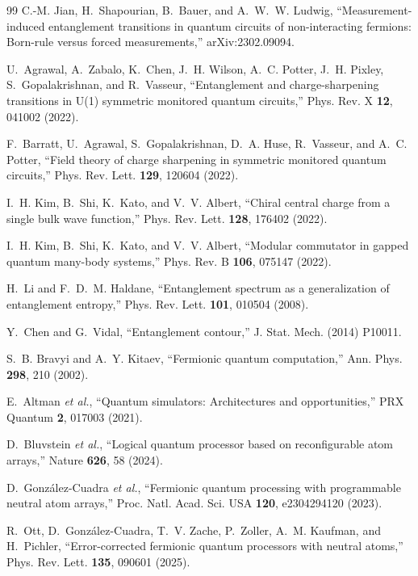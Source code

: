 \documentclass[aps,prl,twocolumn,floatfix,superscriptaddress,nofootinbib]{revtex4-2}
\begin{document}
\begin{thebibliography}{99}
C.-M. Jian, H.~Shapourian, B.~Bauer, and A.~W.~W. Ludwig,
``Measurement-induced entanglement transitions in quantum circuits of non-interacting fermions: Born-rule versus forced measurements,''
arXiv:2302.09094.

U.~Agrawal, A.~Zabalo, K.~Chen, J.~H. Wilson, A.~C. Potter, J.~H. Pixley, S.~Gopalakrishnan, and R.~Vasseur,
``Entanglement and charge-sharpening transitions in U(1) symmetric monitored quantum circuits,''
Phys. Rev. X \textbf{12}, 041002 (2022).

F.~Barratt, U.~Agrawal, S.~Gopalakrishnan, D.~A. Huse, R.~Vasseur, and A.~C. Potter,
``Field theory of charge sharpening in symmetric monitored quantum circuits,''
Phys. Rev. Lett. \textbf{129}, 120604 (2022).

I.~H. Kim, B.~Shi, K.~Kato, and V.~V. Albert,
``Chiral central charge from a single bulk wave function,''
Phys. Rev. Lett. \textbf{128}, 176402 (2022).

I.~H. Kim, B.~Shi, K.~Kato, and V.~V. Albert,
``Modular commutator in gapped quantum many-body systems,''
Phys. Rev. B \textbf{106}, 075147 (2022).

H.~Li and F.~D.~M. Haldane,
``Entanglement spectrum as a generalization of entanglement entropy,''
Phys. Rev. Lett. \textbf{101}, 010504 (2008).

Y.~Chen and G.~Vidal,
``Entanglement contour,''
J. Stat. Mech. (2014) P10011.

S.~B. Bravyi and A.~Y. Kitaev,
``Fermionic quantum computation,''
Ann. Phys. \textbf{298}, 210 (2002).

E.~Altman \emph{et al.},
``Quantum simulators: Architectures and opportunities,''
PRX Quantum \textbf{2}, 017003 (2021).

D.~Bluvstein \emph{et al.},
``Logical quantum processor based on reconfigurable atom arrays,''
Nature \textbf{626}, 58 (2024).

D.~Gonz\'alez-Cuadra \emph{et al.},
``Fermionic quantum processing with programmable neutral atom arrays,''
Proc. Natl. Acad. Sci. USA \textbf{120}, e2304294120 (2023).

R.~Ott, D.~Gonz\'alez-Cuadra, T.~V. Zache, P.~Zoller, A.~M. Kaufman, and H.~Pichler,
``Error-corrected fermionic quantum processors with neutral atoms,''
Phys. Rev. Lett. \textbf{135}, 090601 (2025).


\end{thebibliography}
\end{document}
